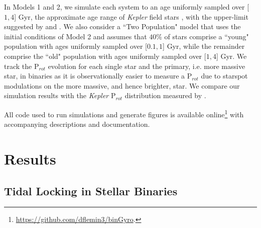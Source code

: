 \documentclass[twocolumn]{aastex61}
\begin{document}
In Models 1 and 2, we simulate each system to an age uniformly sampled over [$1,4$] Gyr, the approximate age range of \textit{Kepler} field stars \citep{McQuillan2014,Angus2015}, with the upper-limit suggested by \citet{McQuillan2014} and \citet{Matt2015}. We also consider a ``Two Population" model that uses the initial conditions of Model 2 and assumes that $40\%$ of stars comprise a ``young" population with ages uniformly sampled over [$0.1,1$] Gyr, while the remainder comprise the ``old" population with ages uniformly sampled over [$1,4$] Gyr. We track the P$_{rot}$ evolution for each single star and the primary, i.e. more massive star, in binaries as it is observationally easier to measure a P$_{rot}$ due to starspot modulations on the more massive, and hence brighter, star. We compare our simulation results with the \textit{Kepler} P$_{rot}$ distribution measured by \citet{McQuillan2014}.

All code used to run simulations and generate figures is available online\footnote{\href{https://github.com/dflemin3/binGyro}{https://github.com/dflemin3/binGyro}.} with accompanying descriptions and documentation.




\section{Results} \label{sec:results}

\subsection{Tidal Locking in Stellar Binaries} \label{sec:results:locking}
\end{document}
